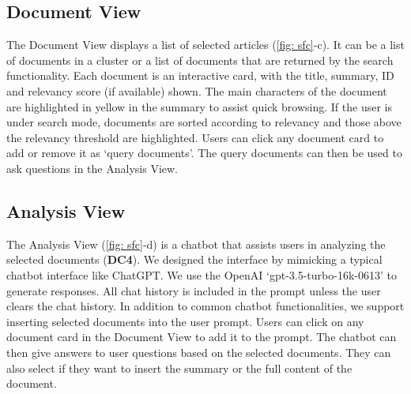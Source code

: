 \subsection{Document View}
The Document View displays a list of selected articles (\autoref{fig: sfc}-c).
It can be a list of documents in a cluster or a list of documents that are returned by the search functionality.
Each document is an interactive card, with the title, summary, ID and relevancy score (if available) shown.
The main characters of the document are highlighted in yellow in the summary to assist quick browsing.
If the user is under search mode, documents are sorted according to relevancy and those above the relevancy threshold are highlighted.
Users can click any document card to add or remove it as `query documents'.
The query documents can then be used to ask questions in the Analysis View.

\subsection{Analysis View}
The Analysis View (\autoref{fig: sfc}-d) is a chatbot that assists users in analyzing the selected documents (\textbf{DC4}).
We designed the interface by mimicking a typical chatbot interface like ChatGPT.
We use the OpenAI `gpt-3.5-turbo-16k-0613' to generate responses.
All chat history is included in the prompt unless the user clears the chat history.
In addition to common chatbot functionalities, we support inserting selected documents into the user prompt.
Users can click on any document card in the Document View to add it to the prompt.
The chatbot can then give answers to user questions based on the selected documents.
They can also select if they want to insert the summary or the full content of the document.

